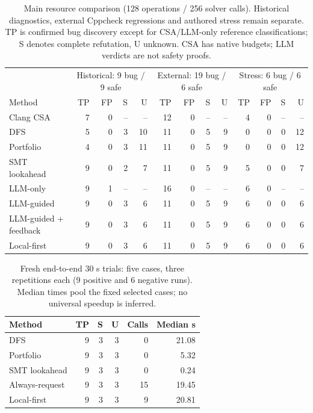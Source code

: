 \begin{table}[t]
\centering\small
\caption{Main resource comparison (128 operations / 256 solver calls). Historical diagnostics, external Cppcheck regressions and authored stress remain separate. TP is confirmed bug discovery except for CSA/LLM-only reference classifications; S denotes complete refutation, U unknown. CSA has native budgets; LLM verdicts are not safety proofs.}
\label{tab:v4-main}
\begin{tabular}{lrrrrrrrrrrrr}\toprule
 & \multicolumn{4}{c}{Historical: 9 bug / 9 safe} & \multicolumn{4}{c}{External: 19 bug / 6 safe} & \multicolumn{4}{c}{Stress: 6 bug / 6 safe}\\
Method & TP & FP & S & U & TP & FP & S & U & TP & FP & S & U\\\midrule
Clang CSA & 7 & 0 & -- & -- & 12 & 0 & -- & -- & 4 & 0 & -- & --\\
DFS & 5 & 0 & 3 & 10 & 11 & 0 & 5 & 9 & 0 & 0 & 0 & 12\\
Portfolio & 4 & 0 & 3 & 11 & 11 & 0 & 5 & 9 & 0 & 0 & 0 & 12\\
SMT lookahead & 9 & 0 & 2 & 7 & 11 & 0 & 5 & 9 & 5 & 0 & 0 & 7\\
LLM-only & 9 & 1 & -- & -- & 16 & 0 & -- & -- & 6 & 0 & -- & --\\
LLM-guided & 9 & 0 & 3 & 6 & 11 & 0 & 5 & 9 & 6 & 0 & 0 & 6\\
LLM-guided + feedback & 9 & 0 & 3 & 6 & 11 & 0 & 5 & 9 & 6 & 0 & 0 & 6\\
Local-first & 9 & 0 & 3 & 6 & 11 & 0 & 5 & 9 & 6 & 0 & 0 & 6\\
\bottomrule\end{tabular}
\end{table}
\begin{table}[t]\centering\small
\caption{Fresh end-to-end 30 s trials: five cases, three repetitions each (9 positive and 6 negative runs). Median times pool the fixed selected cases; no universal speedup is inferred.}
\label{tab:v4-timing}
\begin{tabular}{lrrrrr}\toprule
Method & TP & S & U & Calls & Median s\\\midrule
DFS & 9 & 3 & 3 & 0 & 21.08\\
Portfolio & 9 & 3 & 3 & 0 & 5.32\\
SMT lookahead & 9 & 3 & 3 & 0 & 0.24\\
Always-request & 9 & 3 & 3 & 15 & 19.45\\
Local-first & 9 & 3 & 3 & 9 & 20.81\\
\bottomrule\end{tabular}\end{table}
